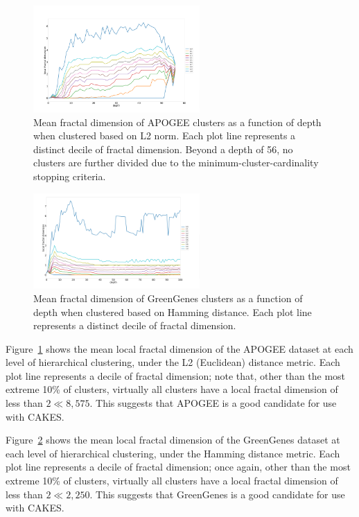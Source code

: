 \begin{figure}[ht!]
    \centering
    \includegraphics[width=2.5in]{images/lfd_plots/lfd_plot_apogee.png}
    \caption{Mean fractal dimension of APOGEE clusters as a function of
    depth when clustered based on L2 norm. Each plot line represents a distinct
    decile of fractal dimension. Beyond a depth of 56, no clusters are further
    divided due to the minimum-cluster-cardinality stopping criteria.}
    \label{fig:methods:lfd_apogee}
\end{figure}

\begin{figure}[ht!]
    \centering
    \includegraphics[width=2.5in]{images/lfd_plots/lfd_plot_greengenes.png}
    \caption{Mean fractal dimension of GreenGenes clusters as a function of
    depth when clustered based on Hamming distance. Each plot line represents
    a distinct decile of fractal dimension.}
    \label{fig:methods:lfd_greengenes}
\end{figure}

Figure~\ref{fig:methods:lfd_apogee} shows the mean local fractal dimension of the APOGEE dataset at each level of hierarchical clustering, 
under the L2 (Euclidean) distance metric. Each plot line represents a decile of fractal dimension; note that, other than the most extreme 10\% of clusters,
virtually all clusters have a local fractal dimension of less than $2 \ll 8,575$. This suggests that APOGEE is a good candidate for use with CAKES. 


Figure~\ref{fig:methods:lfd_greengenes} shows the mean local fractal dimension of the GreenGenes dataset at each level of hierarchical clustering,
under the Hamming distance metric. Each plot line represents a decile of fractal dimension; once again, other than the most extreme 10\% of clusters,
virtually all clusters have a local fractal dimension of less than $2 \ll 2,250$. This suggests that GreenGenes is a good candidate for use with CAKES.



